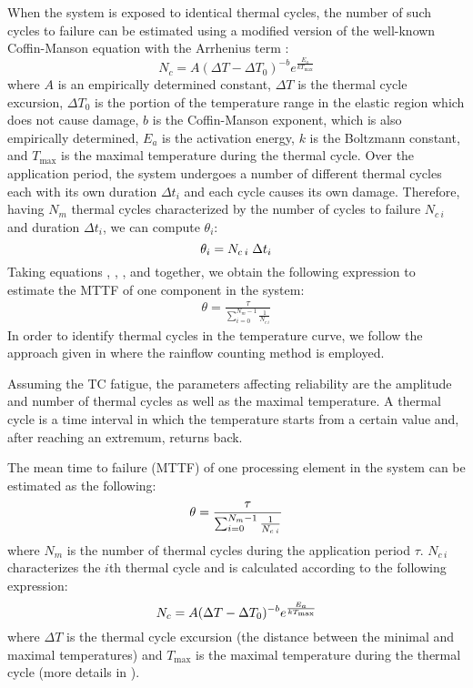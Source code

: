 When the system is exposed to identical thermal cycles, the number of such
cycles to failure can be estimated using a modified version of the well-known
Coffin-Manson equation with the Arrhenius term \cite{xiang2010, jedec2010}:
\[
  N_c = A (\Delta T - \Delta T_0)^{-b} e^{\frac{E_a}{k T_\text{max}}}
\]
where $A$ is an empirically determined constant, $\Delta T$ is the thermal cycle
excursion, $\Delta T_0$ is the portion of the temperature range in the elastic
region which does not cause damage, $b$ is the Coffin-Manson exponent, which is
also empirically determined, $E_{a}$ is the activation energy, $k$ is the
Boltzmann constant, and $T_\text{max}$ is the maximal temperature during the
thermal cycle. Over the application period, the system undergoes a number of
different thermal cycles each with its own duration $\Delta t_i$ and each cycle
causes its own damage. Therefore, having $N_m$ thermal cycles characterized by
the number of cycles to failure $N_{c\:i}$ and duration $\Delta t_i$, we can
compute $\theta_i$:
\begin{equation} \elab{mttf-cycle}
  \theta_i = N_{c \: i} \; \Delta t_i
\end{equation}
Taking equations , ,
, and  together, we obtain the following
expression to estimate the MTTF of one component in the system:
\begin{align}
  \theta = \frac{\tau}{\sum_{i=0}^{N_m - 1} \frac{1}{N_{c \: i}}}
\end{align}
In order to identify thermal cycles in the temperature curve, we follow the
approach given in \cite{xiang2010} where the rainflow counting method is
employed.

Assuming the TC fatigue, the parameters affecting reliability are the amplitude
and number of thermal cycles as well as the maximal temperature. A thermal cycle
is a time interval in which the temperature starts from a certain value and,
after reaching an extremum, returns back.

The mean time to failure (MTTF) of one processing element in the system can be
estimated as the following:
\begin{align} \elab{one-mttf}
  \theta = \frac{\tau}{\sum_{i=0}^{N_m - 1} \frac{1}{N_{c \: i}}}
\end{align}
where $N_m$ is the number of thermal cycles during the application period
$\tau$. $N_{c \: i}$ characterizes the $i$th thermal cycle and is calculated
according to the following expression:
\begin{equation} \elab{cycles-to-failure}
  N_c = A (\Delta T - \Delta T_0)^{-b} e^{\frac{E_a}{k T_\text{max}}}
\end{equation}
where $\Delta T$ is the thermal cycle excursion (the distance between the
minimal and maximal temperatures) and $T_\text{max}$ is the maximal temperature
during the thermal cycle (more details in ).

